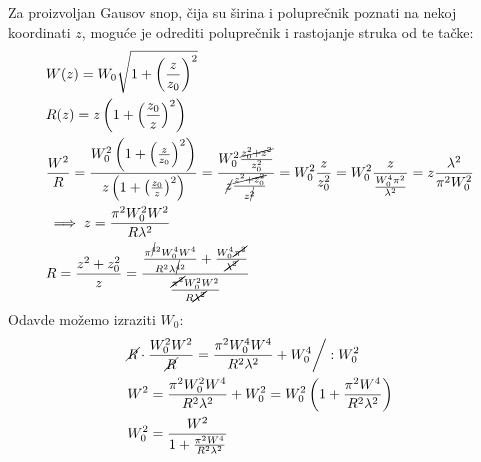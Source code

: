 \documentclass[fleqn]{report}
\begin{document}
\begin{tbox}
    Za proizvoljan Gausov snop, čija su širina i poluprečnik poznati na nekoj koordinati $z$, moguće je odrediti poluprečnik i rastojanje struka od te tačke:
    \begin{align*}
         & W(z) = W_0 \sqrt{1 + \left(\frac{z}{z_0}\right)^2}                                                                                                                                                                                                                                                                                             \\
         & R(z) = z\left(1 + \left(\frac{z_0}{z}\right)^2\right)                                                                                                                                                                                                                                                                                          \\
         & \frac{W^2}{R} = \frac{W_0^2 \left(1 + \left(\frac{z}{z_0}\right)^2\right)}{z \left(1 + \left(\frac{z_0}{z}\right)^2\right)} = \frac{W_0^2 \frac{\cancel{z_0^2 + z^2}}{z_0^2}}{\cancel{z}\frac{\cancel{z^2 + z_0^2}}{z^{\cancel{2}}}} = W_0^2 \frac{z}{z_0^2} = W_0^2 \frac{z}{\frac{W_0^4 \pi^2}{\lambda^2}} = z \frac{\lambda^2}{\pi^2 W_0^2} \\
         & \implies z = \frac{\pi^2 W_0^2 W^2}{R \lambda^2}                                                                                                                                                                                                                                                                                               \\
         & R = \frac{z^2 + z_0^2}{z} = \frac{\frac{\pi^{\cancel{4} 2} W_0^4 W^4}{R^2 \lambda^{\cancel{4}2}} + \frac{W_0^4 \cancel{\pi^2}}{\cancel{\lambda^2}}}{\frac{\cancel{\pi^2} W_0^2 W^2}{R \cancel{\lambda^2}}}
    \end{align*}
    Odavde možemo izraziti $W_0$:
    \begin{align*}
         & \cancel{R} \cdot \frac{W_0^2 W^2}{\cancel{R}} = \frac{\pi^2 W_0^4 W^4}{R^2 \lambda ^2} + W_0^4 \bigg/ :W_0^2 \\
         & W^2 = \frac{\pi^2 W_0^2 W^4}{R^2 \lambda^2} + W_0^2 = W_0^2 \left(1 + \frac{\pi^2 W^4}{R^2 \lambda^2}\right) \\
         & W_0^2 = \frac{W^2}{1 + \frac{\pi^2 W^4}{R^2 \lambda^2}}
    \end{align*}

\end{tbox}
\end{document}
